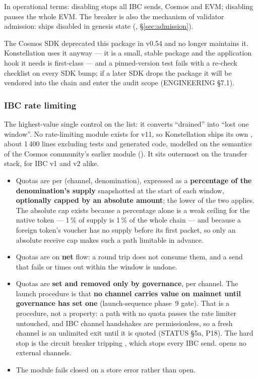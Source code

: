 In operational terms: disabling  stops all IBC sends, Cosmos
and EVM; disabling  pauses the whole EVM. The breaker is
also the mechanism of validator admission:  ships
disabled in genesis state (, \S\ref{sec:admission}).

The Cosmos SDK deprecated this package in v0.54 and no longer maintains it.
Konstellation uses it anyway --- it is a small, stable package and the
application hook it needs is first-class --- and a pinned-version test fails
with a re-check checklist on every SDK bump; if a later SDK drops the package it will
be vendored into the chain and enter the audit scope (ENGINEERING \S7.1).

\subsubsection{IBC rate limiting}
\label{sec:ratelimit}

The highest-value single control on the list: it converts ``drained'' into
``lost one window''. No rate-limiting module exists for  v11, so
Konstellation ships its own , about 1\,400 lines excluding
tests and generated code, modelled on the semantics of the Cosmos community's
earlier module (). It sits
outermost on the transfer stack, for IBC v1 and v2 alike.

\begin{itemize}
\item Quotas are per (channel, denomination), expressed as a \textbf{percentage
  of the denomination's supply} snapshotted at the start of each window,
  \textbf{optionally capped by an absolute amount}; the lower of the two
  applies. The absolute cap exists because a percentage alone is a weak ceiling
  for the native token --- 1\,\% of \kash{} supply is 1\,\% of the whole chain
  --- and because a foreign token's voucher has no supply before its first
  packet, so only an absolute receive cap makes such a path limitable in
  advance.
\item Quotas are on \textbf{net} flow: a round trip does not consume them, and a
  send that fails or times out within the window is undone.
\item Quotas are \textbf{set and removed only by governance}, per channel. The
  launch procedure is that \textbf{no channel carries value on mainnet until
  governance has set one} (launch-sequence phase~9 gate). That is a procedure,
  not a property: a path with no quota passes the rate limiter untouched, and
  IBC channel handshakes are permissionless, so a fresh channel is an
  unlimited exit until it is quoted (STATUS \S5a, P18). The hard stop is the
  circuit breaker tripping , which stops every IBC send.
    opens
  no external channels.
\item The module fails closed on a store error rather than open.
\end{itemize}

